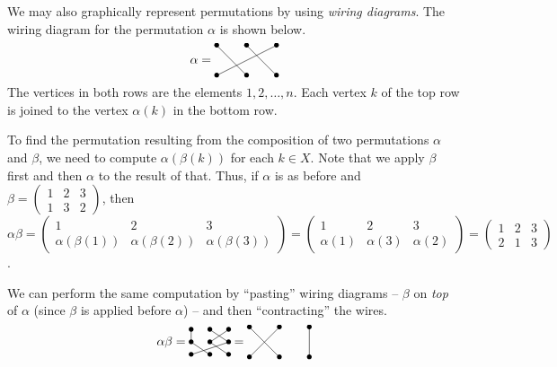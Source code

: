 \documentclass[svgnames]{article}
\theoremstyle{definition}
\theoremstyle{remark}
\begin{document}
\begin{appendices}
We may also graphically represent permutations by using \emph{wiring diagrams}. The wiring diagram for the permutation $\alpha$ is shown below.
\begin{equation*}
\alpha = \,\vcenter{\xymatrix{
*=0{\bullet} \ar@{-}[dr]	&	*=0{\bullet} \ar@{-}[dr]	&	*=0{\bullet} \ar@{-}[dll]\\
*=0{\bullet}	&	*=0{\bullet}	&	*=0{\bullet}
}}
\end{equation*}
The vertices in both rows are the elements $1, 2, \ldots, n$. Each vertex $k$ of the top row is joined to the vertex $\alpha(k)$ in the bottom row.

To find the permutation resulting from the composition of two permutations $\alpha$ and $\beta$, we need to compute $\alpha(\beta(k))$ for each $k \in X$. Note that we apply $\beta$ first and then $\alpha$ to the result of that. Thus, if $\alpha$ is as before and $\beta = \begin{pmatrix}
1 & 2 & 3\\
1 & 3 & 2
\end{pmatrix}$, then $\alpha\beta = \begin{pmatrix}
1 & 2 & 3\\
\alpha(\beta(1)) & \alpha(\beta(2)) & \alpha(\beta(3))
\end{pmatrix} = \begin{pmatrix}
1 & 2 & 3\\
\alpha(1) & \alpha(3) & \alpha(2)
\end{pmatrix} = \begin{pmatrix}
1 & 2 & 3\\
2 & 1 & 3
\end{pmatrix}$.

We can perform the same computation by ``pasting'' wiring diagrams -- $\beta$ on \emph{top} of $\alpha$ (since $\beta$ is applied before $\alpha$) -- and then ``contracting'' the wires.
\begin{equation*}
\alpha\beta = \,\vcenter{\xymatrix@R=1em@C=1.5em{
*=0{\bullet} \ar@{-}[d]		&	*=0{\bullet} \ar@{-}[dr]	&	*=0{\bullet} \ar@{-}[dl]\\
*=0{\bullet} \ar@{-}[dr]	&	*=0{\bullet} \ar@{-}[dr]	&	*=0{\bullet} \ar@{-}[dll]\\
*=0{\bullet}				&	*=0{\bullet}				&	*=0{\bullet}\\		
}}\, = \,\vcenter{\xymatrix{
*=0{\bullet} \ar@{-}[dr]	&	*=0{\bullet} \ar@{-}[dl]	&	*=0{\bullet} \ar@{-}[d]\\
*=0{\bullet}				&	*=0{\bullet}				&	*=0{\bullet}\\
}}
\end{equation*}


\end{appendices}
\end{document}
